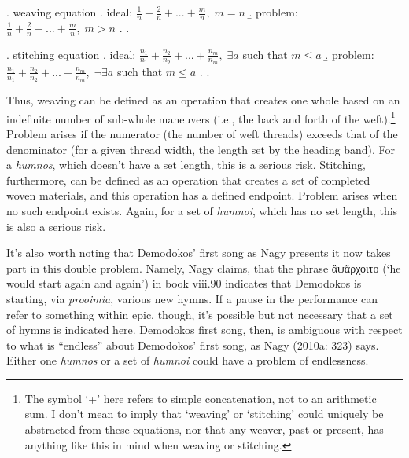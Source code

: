 \documentclass[12pt]{article}
\begin{document}
\ex. weaving equation
\a. ideal: \begin{math} \frac{1}{n} + \frac{2}{n} + ... + \frac{m}{n}, \; m = n \end{math}
\b. problem: \begin{math} \frac{1}{n} + \frac{2}{n} + ... + \frac{m}{n}, \; m > n \end{math}
\z. \z. 

\ex. stitching equation
\a. ideal: \begin{math} \frac{n_1}{n_1} + \frac{n_2}{n_2} + ... + \frac{n_m}{n_m}, \; \exists a \end{math} such that \begin{math} m \leq a \end{math}
\b. problem: \begin{math} \frac{n_1}{n_1} + \frac{n_2}{n_2} + ... + \frac{n_m}{n_m}, \; \neg \exists a \end{math} such that \begin{math} m \leq a \end{math}
\z. \z. 

Thus, weaving can be defined as an operation that creates one whole based on an indefinite number of sub-whole maneuvers (i.e., the back and forth of the weft).\footnote{ The symbol `+' here refers to simple concatenation, not to an arithmetic sum. I don't mean to imply that `weaving' or `stitching' could uniquely be abstracted from these equations, nor that any weaver, past or present, has anything like this in mind when weaving or stitching.} Problem arises if the numerator (the number of weft threads) exceeds that of the denominator (for a given thread width, the length set by the heading band). For a \textit{humnos}, which doesn't have a set length, this is a serious risk. Stitching, furthermore, can be defined as an operation that creates a set of completed woven materials, and this operation has a defined endpoint. Problem arises when no such endpoint exists. Again, for a set of \textit{humnoi}, which has no set length, this is also a serious risk.

It's also worth noting that Demodokos' first song as Nagy presents it now takes part in this double problem. Namely, Nagy claims, that the phrase ἂψἄρχοιτο (‘he would start again and again’) in book viii.90 indicates that Demodokos is starting, via \textit{prooimia}, various new hymns. If a pause in the performance can refer to something within epic, though, it's possible but not necessary that a set of hymns is indicated here. Demodokos first song, then, is ambiguous with respect to what is ``endless'' about Demodokos' first song, as Nagy (2010a: 323) says. Either one \textit{humnos} or a set of \textit{humnoi} could have a problem of endlessness.
\end{document}
